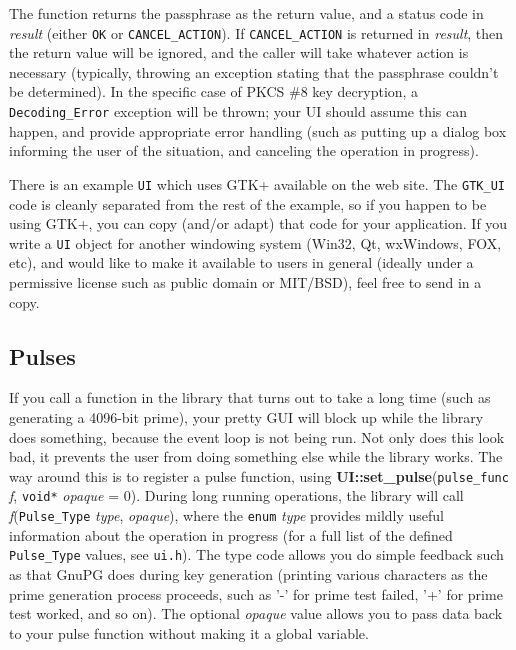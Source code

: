 \documentclass{article}
\newcommand{\filename}[1]{\texttt{#1}}
\newcommand{\function}[1]{\textbf{#1}}
\newcommand{\type}[1]{\texttt{#1}}
\renewcommand{\arg}[1]{\textsl{#1}}
\begin{document}
The function returns the passphrase as the return value, and a status code in
\arg{result} (either \type{OK} or \type{CANCEL\_ACTION}). If
\type{CANCEL\_ACTION} is returned in \arg{result}, then the return value will
be ignored, and the caller will take whatever action is necessary (typically,
throwing an exception stating that the passphrase couldn't be determined). In
the specific case of PKCS \#8 key decryption, a \type{Decoding\_Error}
exception will be thrown; your UI should assume this can happen, and provide
appropriate error handling (such as putting up a dialog box informing the user
of the situation, and canceling the operation in progress).

There is an example \type{UI} which uses GTK+ available on the web site. The
\type{GTK\_UI} code is cleanly separated from the rest of the example, so if
you happen to be using GTK+, you can copy (and/or adapt) that code for your
application. If you write a \type{UI} object for another windowing system
(Win32, Qt, wxWindows, FOX, etc), and would like to make it available to users
in general (ideally under a permissive license such as public domain or
MIT/BSD), feel free to send in a copy.

\subsection{Pulses}

If you call a function in the library that turns out to take a long time (such
as generating a 4096-bit prime), your pretty GUI will block up while the
library does something, because the event loop is not being run. Not only does
this look bad, it prevents the user from doing something else while the library
works. The way around this is to register a pulse function, using
\function{UI::set\_pulse}(\type{pulse\_func} \arg{f}, \type{void*} \arg{opaque}
= 0). During long running operations, the library will call
\arg{f}(\type{Pulse\_Type} \arg{type}, \arg{opaque}), where the \type{enum}
\arg{type} provides mildly useful information about the operation in progress
(for a full list of the defined \type{Pulse\_Type} values, see
\filename{ui.h}). The type code allows you do simple feedback such as that
GnuPG does during key generation (printing various characters as the prime
generation process proceeds, such as '-' for prime test failed, '+' for prime
test worked, and so on). The optional \arg{opaque} value allows you to pass
data back to your pulse function without making it a global variable.
\end{document}
